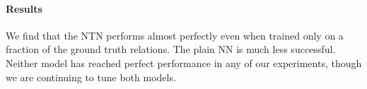 \paragraph{Results} 
We find that the NTN performs almost perfectly even when trained only
on a fraction of the ground truth relations. The plain NN is much less
successful. Neither model has reached perfect performance in any of
our experiments, though we are continuing to tune both models.

\begin{table}[h]
\centering{}
 \caption{Test (train) accuracy figures on the WordNet data. The baseline figure is simply the frequency of the most frequent class, .\label{b-table}}  
\end{table}


